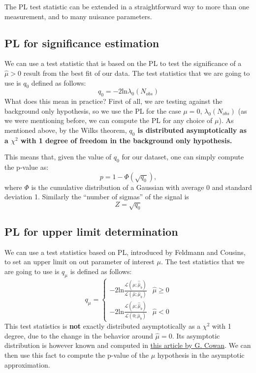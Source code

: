 \documentclass[a4paper,12pt]{article}
\begin{document}
The PL test statistic can be extended in a straightforward way to more than
one measurement, and to many nuisance parameters.

\subsection{PL for significance estimation}
We can use a test statistic that is based on the PL to test the significance
of a $\hat{\mu}>0$ result from the best fit of our data. The test statistics
that we are going to use is $q_{0}$ defined as follows:
\begin{equation}
q_0=-2\mathrm{ln}\lambda_0(N_{obs})
\label{eq:teststat_signif}
\end{equation}
What does this mean in practice? First of all, we are testing against the
background only hypothesis, so we use the PL for the case $\mu=0$,
$\lambda_0(N_{obs})$ (as we were mentioning before, we can compute the PL for
any choice of $\mu$).
As mentioned above, by the Wilks theorem, {\bf $q_0$ is distributed
asymptotically as a $\chi^2$ with 1 degree of freedom in the background only
hypothesis.} 

This means that, given the value of $q_0$ for our dataset, one can simply
compute the p-value as:
\begin{equation}
p=1-\Phi(\sqrt{q_0}),
\end{equation}
where $\Phi$ is the cumulative distribution of a Gaussian with average 0 and
standard deviation 1. Similarly the ``number of sigmas'' of the signal is 
\begin{equation}
Z=\sqrt{q_0}
\end{equation}

\subsection{PL for upper limit determination}
We can use a test statistics based on PL, introduced by Feldmann and Cousins, to set an
upper limit on out parameter of interest $\mu$.
The test statistics
that we are going to use is $q_{\mu}$ is defined as follows:
\begin{equation}
q_{\mu}=\begin{cases}
-2\mathrm{ln}\frac{\mathcal{L}(\mu;\hat{\hat{\mu}}_b)}{\mathcal{L}(\hat{\mu};\hat{\mu}_b)} & \hat{\mu}\geq0 \\
-2\mathrm{ln}\frac{\mathcal{L}(\mu;\hat{\hat{\mu}}_b)}{\mathcal{L}(0;\hat{\mu}_b)} & \hat{\mu}<0
\end{cases}
\label{eq:teststat_limit}
\end{equation}
This test statistics is {\bf not} exactly distributed
asymptotically as a $\chi^2$ with 1 degree, due to the change in the behavior around $\hat{\mu}=0$.
Its asymptotic distribution is however known and computed in \href{https://arxiv.org/abs/1007.1727}{this article by G. Cowan}.
We can then
use this fact to compute the p-value of the $\mu$ hypothesis in the asymptotic
approximation. 
\end{document}
